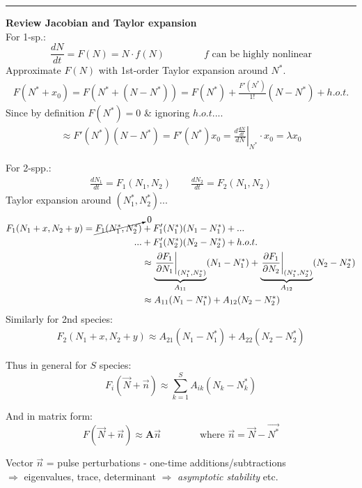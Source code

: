 \documentclass{article}
\newcommand{\ind}{\-\hspace{1cm}}
\begin{document}
\rule[0.5ex]{\linewidth}{1pt}
\textbf{Review Jacobian and Taylor expansion}\\
For 1-sp.:
\begin{equation*}
	\frac{dN}{dt}=F(N)=N\cdot f(N) \qquad \qquad f \text{ can be highly nonlinear}
\end{equation*}
\ind Approximate $F(N)$ with 1st-order Taylor expansion around $N^*$.
\begin{align*}
	F(N^*+x_0)=F(N^*+(N-N^*))=F(N^*) + \frac{F'(N^*)}{1!}(N-N^*)+ h.o.t.
\end{align*}
\ind Since by definition $F(N^*)=0$ \& ignoring $h.o.t.$...
\begin{align*}
 \approx F'(N^*)(N-N^*) = F'(N^*)x_0 = \left.\frac{d\tfrac{dN}{dt}}{dN}\right\vert_{N^*} \cdot x_0 = \lambda x_0
\end{align*}

For 2-spp.:
\begin{align*}
	\frac{dN_1}{dt}=F_1(N_1,N_2) \qquad \frac{dN_2}{dt}=F_2(N_1,N_2)
\end{align*}
\ind Taylor expansion around $(N_1^*, N_2^*)$...
\begin{align*}
	F_1(N_1+x,N_2+y)=\cancelto{0}{F_1(N_1^*,N_2^*)} & + F_1'(N_1^*)(N_1-N_1^*) +... \\
	... & + F_1'(N_2^*)(N_2-N_2^*) + h.o.t.\\
	& \approx \underbrace{\left.\frac{\partial F_1}{\partial N_1}\right\vert_{(N_1^*,N_2^*)}}_{A_{11}}(N_1-N_1^*) + \underbrace{\left.\frac{\partial F_1}{\partial N_2}\right\vert_{(N_1^*,N_2^*)}}_{A_{12}}(N_2-N_2^*)\\
	& \approx A_{11}(N_1-N_1^*) + A_{12}(N_2-N_2^*)
\end{align*}
Similarly for 2nd species:
\begin{align*}
F_2(N_1+x,N_2+y)  \approx A_{21}(N_1-N_1^*) + A_{22}(N_2-N_2^*)
\end{align*}

Thus in general for $S$ species:
\begin{equation*}
	F_i(\vec{N} + \vec{n}) \approx \sum_{k=1}^S A_{ik}(N_k-N_k^*)
\end{equation*}

And in matrix form:
\begin{equation*}
	F(\vec{N}+\vec{n}) \approx \mathbf{A} \vec{n} \qquad \qquad \text{where } \vec{n}=\vec{N}-\vec{N^*}
\end{equation*}

Vector $\vec{n}$ = pulse perturbations - one-time additions/subtractions\\
\ind $\Rightarrow$ eigenvalues, trace, determinant $\Rightarrow$ \emph{asymptotic stability} etc.
\end{document}
